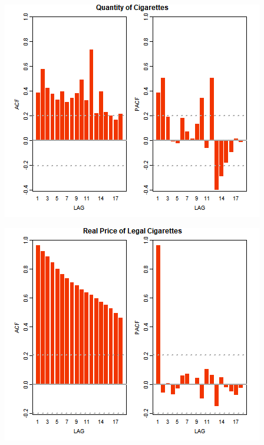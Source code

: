 \documentclass[11pt,preprint, authoryear]{elsarticle}
\let\origfigure\figure
\let\endorigfigure\endfigure
\renewenvironment{figure}[1][2] {
    \expandafter\origfigure\expandafter[H]
} {
    \endorigfigure
}
\numberwithin{equation}{section}
\numberwithin{figure}{section}
\numberwithin{table}{section}
\begin{document}
\begin{figure}[H]

{\centering \includegraphics{Thesis_files/figure-latex/Figure3-1} 

}

\caption{Autocorrelation Function Plots \label{ACF}}\label{fig:Figure3-1}
\end{figure}
\begin{figure}[H]

{\centering \includegraphics{Thesis_files/figure-latex/Figure3-2} 

}

\caption{Autocorrelation Function Plots \label{ACF}}\label{fig:Figure3-2}
\end{figure}
\end{document}
